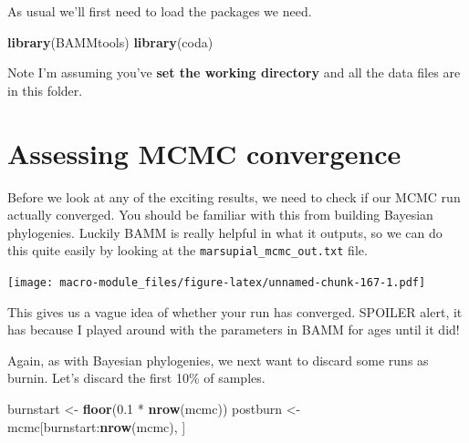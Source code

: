 \documentclass[]{book}
\newenvironment{Shaded}{\begin{snugshade}}{\end{snugshade}}
\newcommand{\KeywordTok}[1]{\textcolor[rgb]{0.13,0.29,0.53}{\textbf{{#1}}}}
\newcommand{\FloatTok}[1]{\textcolor[rgb]{0.00,0.00,0.81}{{#1}}}
\newcommand{\StringTok}[1]{\textcolor[rgb]{0.31,0.60,0.02}{{#1}}}
\newcommand{\CommentTok}[1]{\textcolor[rgb]{0.56,0.35,0.01}{\textit{{#1}}}}
\newcommand{\NormalTok}[1]{{#1}}
\begin{document}
As usual we'll first need to load the packages we need.

\begin{Shaded}
\begin{Highlighting}[]
\KeywordTok{library}\NormalTok{(BAMMtools)}
\KeywordTok{library}\NormalTok{(coda)}
\end{Highlighting}
\end{Shaded}

Note I'm assuming you've \textbf{set the working directory} and all the
data files are in this folder.

\section{Assessing MCMC convergence}\label{assessing-mcmc-convergence}

Before we look at any of the exciting results, we need to check if our
MCMC run actually converged. You should be familiar with this from
building Bayesian phylogenies. Luckily BAMM is really helpful in what it
outputs, so we can do this quite easily by looking at the
\texttt{marsupial\_mcmc\_out.txt} file.

\begin{Shaded}
\end{Shaded}

\texttt{[image: macro-module\_files/figure-latex/unnamed-chunk-167-1.pdf]}

This gives us a vague idea of whether your run has converged. SPOILER
alert, it has because I played around with the parameters in BAMM for
ages until it did!

Again, as with Bayesian phylogenies, we next want to discard some runs
as burnin. Let's discard the first 10\% of samples.

\begin{Shaded}
\begin{Highlighting}[]
\NormalTok{burnstart <-}\StringTok{ }\KeywordTok{floor}\NormalTok{(}\FloatTok{0.1} \NormalTok{*}\StringTok{ }\KeywordTok{nrow}\NormalTok{(mcmc))}
\NormalTok{postburn <-}\StringTok{ }\NormalTok{mcmc[burnstart:}\KeywordTok{nrow}\NormalTok{(mcmc), ]}
\end{Highlighting}
\end{Shaded}
\end{document}
